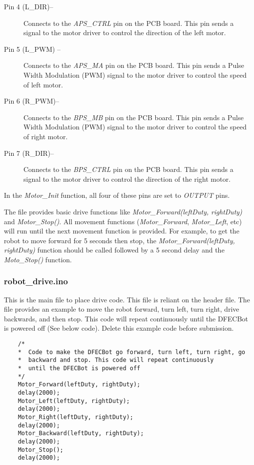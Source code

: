 \documentclass{handout}
\begin{document}
	\begin{description}
		\item[Pin 4 (L\_DIR)--] Connects to the \textit{APS\_CTRL} pin on the PCB board. This pin sends a signal to the motor driver to control the direction of the left motor.
		
		\item[Pin 5 (L\_PWM) --] Connects to the \textit{APS\_MA} pin on the PCB board. This pin sends a Pulse Width Modulation (PWM) signal to the motor driver to control the speed of left motor.
		
		\item[Pin 6 (R\_PWM)--] Connects to the \textit{BPS\_MB} pin on the PCB board. This pin sends a Pulse Width Modulation (PWM) signal to the motor driver to control the speed of right motor.
		\item[Pin 7 (R\_DIR)--] Connects to the \textit{BPS\_CTRL} pin on the PCB board. This pin sends a signal to the motor driver to control the direction of the right motor.
	\end{description}
	
	In the \textit{Motor\_Init} function, all four of these pins are set to \textit{OUTPUT} pins. 
	
	The  file provides basic drive functions like \textit{Motor\_Forward(leftDuty, rightDuty)} and \textit{Motor\_Stop()}. All movement functions (\textit{Motor\_Forward}, \textit{Motor\_Left}, etc) will run until the next movement function is provided. For example, to get the robot to move forward for 5 seconds then stop, the \textit{Motor\_Forward(leftDuty, rightDuty)} function should be called followed by a 5 second delay and the \textit{Moto\_Stop()} function.
	
	\subsubsection{robot\_drive.ino}
	This is the main file to place drive code. This file is reliant on the  header file. The  file provides an example to move the robot forward, turn left, turn right, drive backwards, and then stop. This code will repeat continuously until the DFECBot is powered off (See below code). Delete this example code before submission.
	
	\begin{lstlisting}
	/* 
	*  Code to make the DFECBot go forward, turn left, turn right, go 
	*  backward and stop. This code will repeat continuously 
	*  until the DFECBot is powered off
	*/
	Motor_Forward(leftDuty, rightDuty);
	delay(2000);
	Motor_Left(leftDuty, rightDuty);
	delay(2000);
	Motor_Right(leftDuty, rightDuty);
	delay(2000);
	Motor_Backward(leftDuty, rightDuty);
	delay(2000);
	Motor_Stop();
	delay(2000);
	\end{lstlisting}
	
\end{document}
